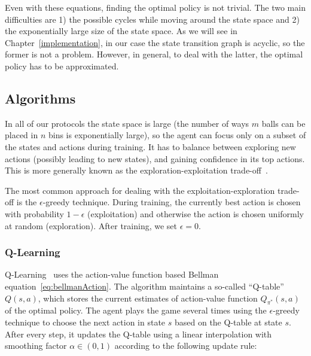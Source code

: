 Even with these equations, finding the optimal policy is not trivial. The two main difficulties are 1) the possible cycles while moving around the state space and 2) the exponentially large size of the state space. As we will see in Chapter~\ref{implementation}, in our case the state transition graph is acyclic, so the former is not a problem. However, in general, to deal with the latter, the optimal policy has to be approximated.



\subsection{Algorithms}


In all of our protocols the state space is large (the number of ways $m$ balls can be placed in $n$ bins is exponentially large), so the agent can focus only on a subset of the states and actions during training. It has to balance between exploring new actions (possibly leading to new states), and gaining confidence in its top actions. This is more generally known as the exploration-exploitation trade-off~\cite{kaelbling1996explorationexploitation}.

The most common approach for dealing with the exploitation-exploration trade-off is the $\epsilon$-greedy technique. During training, the currently best action is chosen with probability $1-\epsilon$ (exploitation) and otherwise the action is chosen uniformly at random (exploration). After training, we set $\epsilon=0$.



\subsubsection{Q-Learning}


Q-Learning~\cite{watkins1989qlearning} uses the action-value function based Bellman equation~\eqref{eq:bellmanAction}. The algorithm maintains a so-called ``Q-table'' $Q(s,a)$, which stores the current estimates of action-value function $Q_{\pi^*}(s,a)$ of the optimal policy. The agent plays the game several times using the $\epsilon$-greedy technique to choose the next action in state $s$ based on the Q-table at state $s$. After every step, it updates the Q-table using a linear interpolation with smoothing factor $\alpha \in (0,1)$ according to the following update rule:

